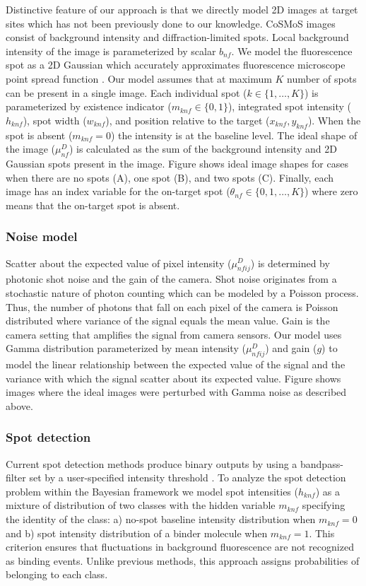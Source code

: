 Distinctive feature of our approach is that we directly model 2D images at target sites which has not been previously done to our knowledge. CoSMoS images consist of background intensity and diffraction-limited spots. Local background intensity of the image is parameterized by scalar $b_{nf}$. We model the fluorescence spot as a 2D Gaussian which accurately approximates fluorescence microscope point spread function \citep{Zhang2007-rb}. Our model assumes that at maximum $K$ number of spots can be present in a single image. Each individual spot ($k \in \{1,\dots,K\}$) is parameterized by existence indicator ($m_{knf} \in \{0,1\}$), integrated spot intensity ($h_{knf}$), spot width ($w_{knf}$), and position relative to the target ($x_{knf},y_{knf}$). When the spot is absent ($m_{knf}=0$) the intensity is at the baseline level. The ideal shape of the image ($\mu^D_{nf}$) is calculated as the sum of the background intensity and 2D Gaussian spots present in the image. Figure shows ideal image shapes for cases when there are no spots (A), one spot (B), and two spots (C). Finally, each image has an index variable for the on-target spot ($\theta_{nf} \in \{0,1,\dots,K\}$) where zero means that the on-target spot is absent.

\subsubsection{Noise model}

Scatter about the expected value of pixel intensity ($\mu^D_{nfij}$) is determined by photonic shot noise and the gain of the camera. Shot noise originates from a stochastic nature of photon counting which can be modeled by a Poisson process. Thus, the number of photons that fall on each pixel of the camera is Poisson distributed where variance of the signal equals the mean value. Gain is the camera setting that amplifies the signal from camera sensors. Our model uses Gamma distribution parameterized by mean intensity ($\mu^D_{nfij}$) and gain ($g$) to model the linear relationship between the expected value of the signal and the variance with which the signal scatter about its expected value. Figure shows images  where the ideal images were perturbed with Gamma noise as described above.

\subsubsection{Spot detection}

Current spot detection methods produce binary outputs by using a bandpass-filter set by a user-specified intensity threshold \citep{Friedman2015-nx, Smith2019-yb}. To analyze the spot detection problem within the Bayesian framework we model spot intensities ($h_{knf}$) as a mixture of distribution of two classes with the hidden variable $m_{knf}$ specifying the identity of the class: a) no-spot baseline intensity distribution when $m_{knf}=0$ and b) spot intensity distribution of a binder molecule when $m_{knf}=1$.  This criterion ensures that fluctuations in background fluorescence are not
recognized as binding events. Unlike previous methods, this approach assigns probabilities of belonging to each class.

